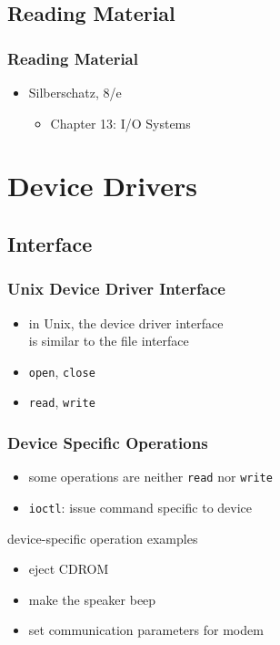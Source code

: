 \documentclass[dvipsnames]{beamer}
\begin{document}
\subsection*{Reading Material}

\begin{frame}
  \frametitle{Reading Material}

  \begin{itemize}
    \item Silberschatz, 8/e
    \begin{itemize}
      \item Chapter 13: \alert{I/O Systems}
    \end{itemize}
  \end{itemize}
\end{frame}

\section{Device Drivers}

\subsection{Interface}

\begin{frame}
  \frametitle{Unix Device Driver Interface}

  \begin{itemize}
    \item in Unix, the device driver interface\\
      is similar to the file interface

    \medskip
    \item \lstinline|open|, \lstinline|close|
    \item \lstinline|read|, \lstinline|write|
  \end{itemize}
\end{frame}

\begin{frame}
  \frametitle{Device Specific Operations}

  \begin{itemize}
    \item some operations are neither \lstinline|read| nor \lstinline|write|
    \item \lstinline|ioctl|: issue command specific to device
  \end{itemize}

  \begin{exampleblock}{device-specific operation examples}
    \begin{itemize}
      \item eject CDROM
      \item make the speaker beep
      \item set communication parameters for modem
    \end{itemize}
  \end{exampleblock}
\end{frame}
\end{document}
